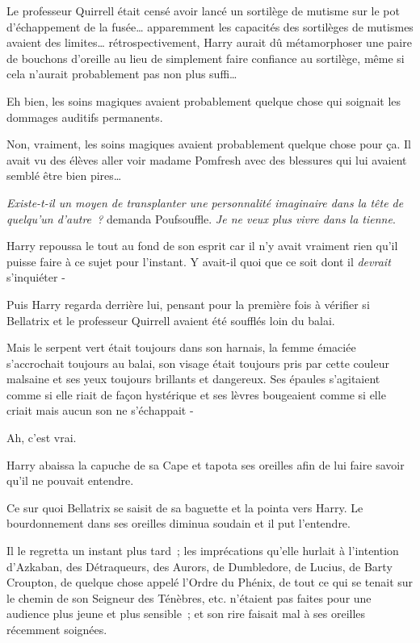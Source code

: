 Le professeur Quirrell était censé avoir lancé un sortilège de mutisme sur le pot d'échappement de la fusée… apparemment les capacités des sortilèges de mutismes avaient des limites… rétrospectivement, Harry aurait dû métamorphoser une paire de bouchons d'oreille au lieu de simplement faire confiance au sortilège, même si cela n'aurait probablement pas non plus suffi…

Eh bien, les soins magiques avaient probablement quelque chose qui soignait les dommages auditifs permanents.

Non, vraiment, les soins magiques avaient probablement quelque chose pour ça. Il avait vu des élèves aller voir madame Pomfresh avec des blessures qui lui avaient semblé être bien pires…

\emph{Existe-t-il un moyen de transplanter une personnalité imaginaire dans la tête de quelqu'un d'autre~?} demanda Poufsouffle. \emph{Je ne veux plus vivre dans la tienne}.

Harry repoussa le tout au fond de son esprit car il n'y avait vraiment rien qu'il puisse faire à ce sujet pour l'instant. Y avait-il quoi que ce soit dont il \emph{devrait} s'inquiéter -

Puis Harry regarda derrière lui, pensant pour la première fois à vérifier si Bellatrix et le professeur Quirrell avaient été soufflés loin du balai.

Mais le serpent vert était toujours dans son harnais, la femme émaciée s'accrochait toujours au balai, son visage était toujours pris par cette couleur malsaine et ses yeux toujours brillants et dangereux. Ses épaules s'agitaient comme si elle riait de façon hystérique et ses lèvres bougeaient comme si elle criait mais aucun son ne s'échappait -

Ah, c'est vrai.

Harry abaissa la capuche de sa Cape et tapota ses oreilles afin de lui faire savoir qu'il ne pouvait entendre.

Ce sur quoi Bellatrix se saisit de sa baguette et la pointa vers Harry. Le bourdonnement dans ses oreilles diminua soudain et il put l'entendre.

Il le regretta un instant plus tard~; les imprécations qu'elle hurlait à l'intention d'Azkaban, des Détraqueurs, des Aurors, de Dumbledore, de Lucius, de Barty Croupton, de quelque chose appelé l'Ordre du Phénix, de tout ce qui se tenait sur le chemin de son Seigneur des Ténèbres, etc. n'étaient pas faites pour une audience plus jeune et plus sensible~; et son rire faisait mal à ses oreilles récemment soignées.

